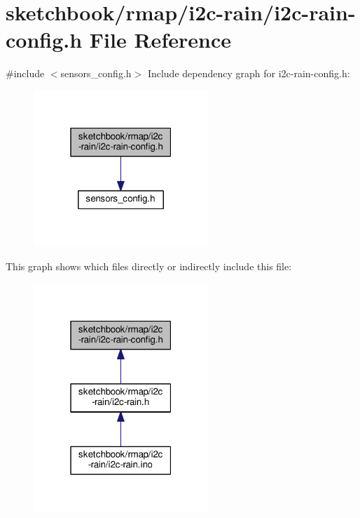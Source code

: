\hypertarget{i2c-rain-config_8h}{}\section{sketchbook/rmap/i2c-\/rain/i2c-\/rain-\/config.h File Reference}
\label{i2c-rain-config_8h}
{\ttfamily \#include $<$sensors\+\_\+config.\+h$>$}\newline
Include dependency graph for i2c-\/rain-\/config.h\+:\nopagebreak
\begin{figure}[H]
\begin{center}
\leavevmode
\includegraphics[width=187pt]{i2c-rain-config_8h__incl}
\end{center}
\end{figure}
This graph shows which files directly or indirectly include this file\+:\nopagebreak
\begin{figure}[H]
\begin{center}
\leavevmode
\includegraphics[width=187pt]{i2c-rain-config_8h__dep__incl}
\end{center}
\end{figure}
